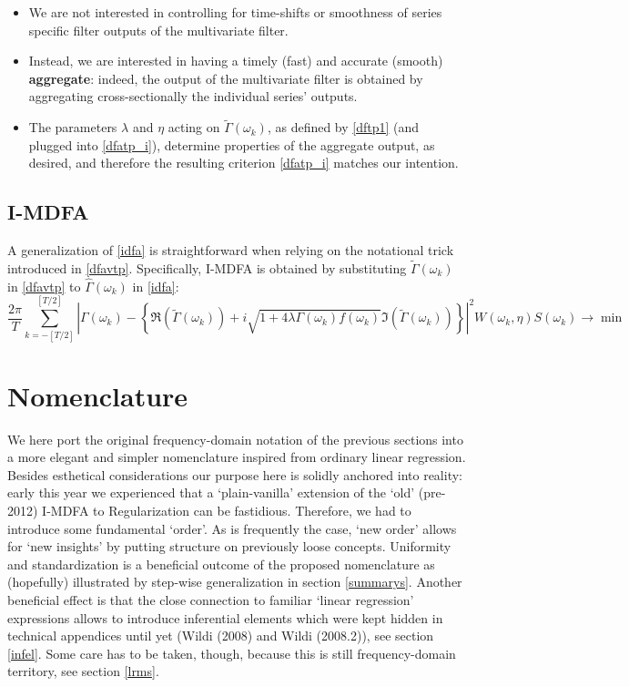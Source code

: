 \documentclass[11pt]{article}
\begin{document}
\begin{itemize}
    \item We are not interested in controlling for time-shifts or smoothness of series specific filter outputs of the multivariate filter.
    \item Instead, we are interested in having a timely (fast) and accurate (smooth) \textbf{aggregate}: indeed, the output of the multivariate filter is obtained by aggregating cross-sectionally the individual series' outputs.
    \item The parameters $\lambda$ and $\eta$ acting on $\tilde{\Gamma}(\omega_k)$, as defined by \ref{dftp1} (and plugged into \ref{dfatp_i}), determine properties of the aggregate output, as desired, and therefore the resulting criterion \ref{dfatp_i} matches our intention.
\end{itemize}

  
\subsection{I-MDFA}

A generalization of \ref{idfa} is straightforward when relying on the notational trick introduced in \ref{dfavtp}. Specifically, I-MDFA is obtained by substituting $\tilde{\Gamma}(\omega_k)$ in  \ref{dfavtp} to $\hat{\Gamma}(\omega_k)$ in \ref{idfa}:
\begin{equation}\label{idfam}
\frac{2\pi}{T} \sum_{k=-[T/2]}^{[T/2]}
 \left|\Gamma(\omega_k)-\left\{\Re\left(\tilde{\Gamma}(\omega_k)\right)+i\sqrt{1+4\lambda\Gamma(\omega_k)f(\omega_k)}\Im\left(\tilde{\Gamma}(\omega_k)\right)\right\}\right|^2 W(\omega_k,\eta)S(\omega_k)\to\min
\end{equation}


\section{Nomenclature}\label{linreg}

We here port the original frequency-domain notation of the previous sections into a more elegant and simpler nomenclature inspired from ordinary linear regression. Besides esthetical considerations our purpose here is solidly anchored into reality: early this year we experienced that a `plain-vanilla' extension of the `old' (pre-2012) I-MDFA to Regularization can be fastidious. Therefore, 
we had to introduce some fundamental `order'. As is frequently the case, `new order' allows for `new insights' by putting structure on previously loose concepts. Uniformity and standardization is a beneficial outcome of the proposed nomenclature as (hopefully) illustrated by step-wise generalization in section \ref{summarys}. Another beneficial effect is that the close connection to familiar `linear regression' expressions allows to introduce inferential elements which were kept hidden in technical appendices until yet (Wildi (2008) and Wildi (2008.2)), see section \ref{infel}. Some care has to be taken, though, because this is still frequency-domain territory,  see section \ref{lrms}. 
\end{document}
